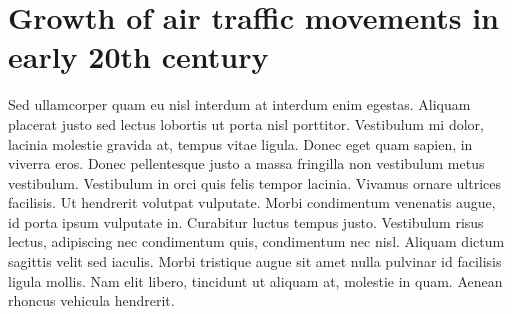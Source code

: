 %
%
%

\section{Growth of air traffic movements in early 20th century}

Sed ullamcorper quam eu nisl interdum at interdum enim egestas. Aliquam placerat justo sed lectus lobortis ut porta nisl porttitor. Vestibulum mi dolor, lacinia molestie gravida at, tempus vitae ligula. Donec eget quam sapien, in viverra eros. Donec pellentesque justo a massa fringilla non vestibulum metus vestibulum. Vestibulum in orci quis felis tempor lacinia. Vivamus ornare ultrices facilisis. Ut hendrerit volutpat vulputate. Morbi condimentum venenatis augue, id porta ipsum vulputate in. Curabitur luctus tempus justo. Vestibulum risus lectus, adipiscing nec condimentum quis, condimentum nec nisl. Aliquam dictum sagittis velit sed iaculis. Morbi tristique augue sit amet nulla pulvinar id facilisis ligula mollis. Nam elit libero, tincidunt ut aliquam at, molestie in quam. Aenean rhoncus vehicula hendrerit.

